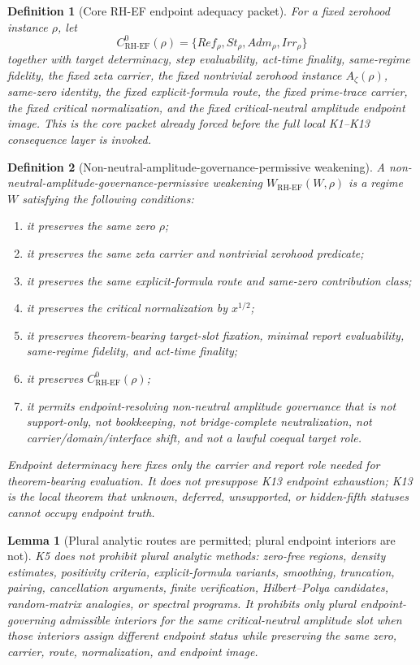 \documentclass[11pt]{article}
\newtheorem{definition}{Definition}[section]
\newtheorem{lemma}{Lemma}[section]
\newcommand{\Az}{A_{\zeta}}
\newcommand{\CoreRHEF}{C^{0}_{\mathrm{RH}\text{-}\mathrm{EF}}}
\newcommand{\WeakRHEF}{W_{\mathrm{RH}\text{-}\mathrm{EF}}}
\begin{document}
\begin{definition}[Core RH-EF endpoint adequacy packet]
For a fixed zerohood instance \(\rho\), let
\[
\CoreRHEF(\rho)=\{Ref_\rho,St_\rho,Adm_\rho,Irr_\rho\}
\]
together with target determinacy, step evaluability, act-time finality, same-regime fidelity, the fixed zeta carrier, the fixed nontrivial zerohood instance \(\Az(\rho)\), same-zero identity, the fixed explicit-formula route, the fixed prime-trace carrier, the fixed critical normalization, and the fixed critical-neutral amplitude endpoint image.  This is the core packet already forced before the full local K1--K13 consequence layer is invoked.
\end{definition}

\begin{definition}[Non-neutral-amplitude-governance-permissive weakening]
A non-neutral-amplitude-governance-permissive weakening \(\WeakRHEF(W,\rho)\) is a regime \(W\) satisfying the following conditions:
\begin{enumerate}
\item it preserves the same zero \(\rho\);
\item it preserves the same zeta carrier and nontrivial zerohood predicate;
\item it preserves the same explicit-formula route and same-zero contribution class;
\item it preserves the critical normalization by \(x^{1/2}\);
\item it preserves theorem-bearing target-slot fixation, minimal report evaluability, same-regime fidelity, and act-time finality;
\item it preserves \(\CoreRHEF(\rho)\);
\item it permits endpoint-resolving non-neutral amplitude governance that is not support-only, not bookkeeping, not bridge-complete neutralization, not carrier/domain/interface shift, and not a lawful coequal target role.
\end{enumerate}
Endpoint determinacy here fixes only the carrier and report role needed for theorem-bearing evaluation.  It does not presuppose K13 endpoint exhaustion; K13 is the local theorem that unknown, deferred, unsupported, or hidden-fifth statuses cannot occupy endpoint truth.
\end{definition}

\begin{lemma}[Plural analytic routes are permitted; plural endpoint interiors are not]
K5 does not prohibit plural analytic methods: zero-free regions, density estimates, positivity criteria, explicit-formula variants, smoothing, truncation, pairing, cancellation arguments, finite verification, Hilbert--Polya candidates, random-matrix analogies, or spectral programs.  It prohibits only plural endpoint-governing admissible interiors for the same critical-neutral amplitude slot when those interiors assign different endpoint status while preserving the same zero, carrier, route, normalization, and endpoint image.
\end{lemma}
\end{document}
